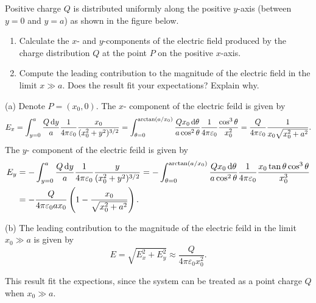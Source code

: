 \documentclass{article}
\begin{document}
\begin{problem}
Positive charge $Q$ is distributed uniformly along the positive $y$-axis (between $y = 0$ and $y = a$) as shown in the figure below.
\begin{enumerate}[label=(\alph*)]
  \item Calculate the $x$- and $y$-components of the electric field produced by the charge distribution $Q$ at the point $P$ on the positive $x$-axis.
  \item Compute the leading contribution to the magnitude of the electric field in the limit $x \gg a$. Does the result fit your expectations? Explain why.
\end{enumerate}

\par\medskip
\begin{center}
\end{center}
\end{problem}

\begin{solution}
  (a) Denote \( P=(x_0,0) \). The \( x \)- component of the electric feild is given by
  \[ E_x=\int_{y=0}^{a}\frac{Q\,\mathrm{d} y}{a}\frac{1}{4\pi \varepsilon_0}\frac{x_0}{(x_0^2+y^2)^{3/2}}
  = \int_{\theta=0}^{\arctan (a/x_0)}\frac{Qx_0\,\mathrm{d}\theta}{a\cos^2\theta}\frac{1}{4\pi\varepsilon_0}\frac{\cos^3\theta}{x_0^2}
  =\frac{Q}{4\pi\varepsilon_0}\frac{1}{x_0\sqrt{x_0^2+a^2}}. \]
  The \( y \)- component of the electric feild is given by
  \begin{align*}
    E_y&=- \int_{y=0}^{a}\frac{Q\,\mathrm{d} y}{a}\frac{1}{4\pi \varepsilon_0}\frac{y}{(x_0^2+y^2)^{3/2}}
    = -\int_{\theta=0}^{\arctan (a/x_0)}\frac{Qx_0\,\mathrm{d}\theta}{a\cos^2\theta}\frac{1}{4\pi\varepsilon_0}\frac{x_0\tan\theta\cos^3\theta}{x_0^3}\\
    &=-\frac{Q}{4\pi\varepsilon_0ax_0}\left( 1- \frac{x_0}{\sqrt{x_0^2+a^2}} \right).
  \end{align*} \par
  (b) The leading contribution to the magnitude of the electric feild in the limit \( x_0\gg a \) is given by
  \[ E=\sqrt{E_x^2+E_y^2}\approx \frac{Q}{4\pi\varepsilon_0x_0^2}. \]\par
  This result fit the expections, since the system can be treated as a point charge \( Q \) when \( x_0\gg a \).
\end{solution}
\end{document}
